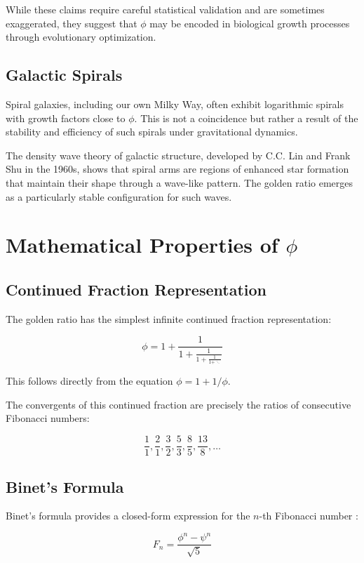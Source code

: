 While these claims require careful statistical validation and are sometimes exaggerated, they suggest that $\phi$ may be encoded in biological growth processes through evolutionary optimization.

\subsection{Galactic Spirals}

Spiral galaxies, including our own Milky Way, often exhibit logarithmic spirals with growth factors close to $\phi$. This is not a coincidence but rather a result of the stability and efficiency of such spirals under gravitational dynamics.

The density wave theory of galactic structure, developed by C.C. Lin and Frank Shu in the 1960s, shows that spiral arms are regions of enhanced star formation that maintain their shape through a wave-like pattern. The golden ratio emerges as a particularly stable configuration for such waves.

\section{Mathematical Properties of $\phi$}

\subsection{Continued Fraction Representation}

The golden ratio has the simplest infinite continued fraction representation:

\[
\phi = 1 + \frac{1}{1 + \frac{1}{1 + \frac{1}{1 + \ddots}}}
\]

This follows directly from the equation $\phi = 1 + 1/\phi$.

The convergents of this continued fraction are precisely the ratios of consecutive Fibonacci numbers:

\[
\frac{1}{1}, \frac{2}{1}, \frac{3}{2}, \frac{5}{3}, \frac{8}{5}, \frac{13}{8}, \dots
\]

\subsection{Binet's Formula}

Binet's formula provides a closed-form expression for the $n$-th Fibonacci number \cite{binet_formula}:

\[
F_n = \frac{\phi^n - \psi^n}{\sqrt{5}}
\]

